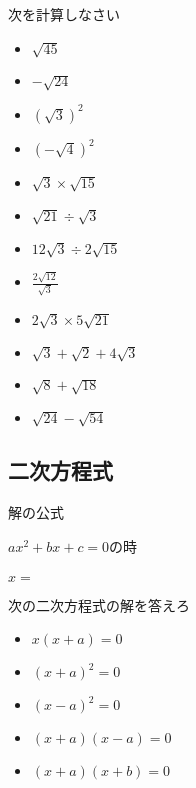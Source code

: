 \documentclass[10pt]{jsarticle}
\begin{document}
\begin{itembox}[l]{次を計算しなさい}
	\begin{Large}
		\begin{multicols}{2}
			\begin{itemize}
				\item $\sqrt{45}$
				\item $-\sqrt{24}$
				\item $(\sqrt{3})^2$
				\item $(-\sqrt{4})^2$
				\item $\sqrt{3}\times\sqrt{15}$
				\item $\sqrt{21}\div\sqrt{3}$
				\item $12\sqrt{3}\div2\sqrt{15}$
				\item $\frac{2\sqrt{12}}{\sqrt{3}}$
				\item $2\sqrt{3}\times5\sqrt{21}$
				\item $\sqrt{3}+\sqrt{2}+4\sqrt{3}$
				\item $\sqrt{8}+\sqrt{18}$
				\item $\sqrt{24}-\sqrt{54}$
			\end{itemize}
		\end{multicols}
	\end{Large}
\end{itembox}



\subsection{二次方程式}
\begin{itembox}[l]{解の公式}
	\begin{Large}
		$ax^2+bx+c=0$の時\\
		\\
		$x=$\\
	\end{Large}
\end{itembox}

\begin{itembox}[l]{次の二次方程式の解を答えろ}
	\begin{Large}
		\begin{multicols}{2}
			\begin{itemize}
				\item $x(x+a)=0$
				\item $(x+a)^2=0$
				\item $(x-a)^2=0$
				\item $(x+a)(x-a)=0$
				\item $(x+a)(x+b)=0$
			\end{itemize}
		\end{multicols}
	\end{Large}
\end{itembox}
\end{document}

